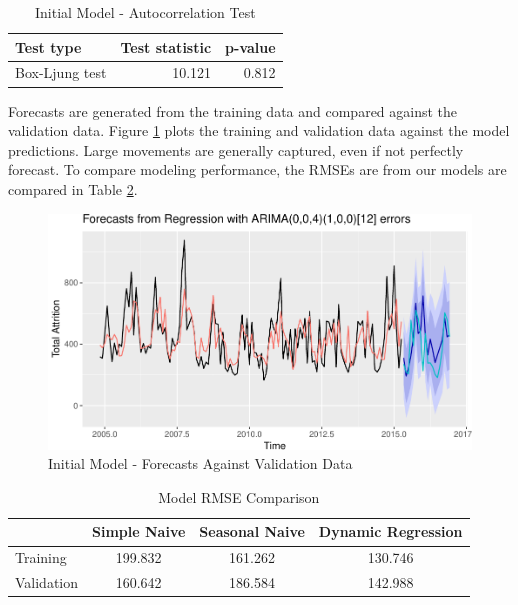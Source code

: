 \documentclass[12pt,letterpaper,toc=flat,oneside]{report}
\theoremstyle{definition}
\theoremstyle{definition}
\theoremstyle{definition}
\theoremstyle{remark}
\begin{document}
\begin{table}

\caption{\label{tab:dynreg1-boxtest}Initial Model - Autocorrelation Test}
\centering
\begin{tabular}[t]{l|r|r}
\hline
Test type & Test statistic & p-value\\
\hline
Box-Ljung test & 10.121 & 0.812\\
\hline
\end{tabular}
\end{table}

Forecasts are generated from the training data and compared against the
validation data. Figure \ref{fig:dynreg1-forecast} plots the training
and validation data against the model predictions. Large movements are
generally captured, even if not perfectly forecast. To compare modeling
performance, the RMSEs are from our models are compared in Table
\ref{tab:model-compare-1}.

\begin{figure}[H]

{\centering \includegraphics{elliott-econometric-personnel-retention-18_files/figure-latex/dynreg1-forecast-1} 

}

\caption{Initial Model - Forecasts Against Validation Data}\label{fig:dynreg1-forecast}
\end{figure}

\begin{table}

\caption{\label{tab:model-compare-1}Model RMSE Comparison}
\centering
\begin{tabular}[t]{l|c|c|c}
\hline
  & Simple Naive & Seasonal Naive & Dynamic Regression\\
\hline
Training & 199.832 & 161.262 & 130.746\\
\hline
Validation & 160.642 & 186.584 & 142.988\\
\hline
\end{tabular}
\end{table}
\end{document}
